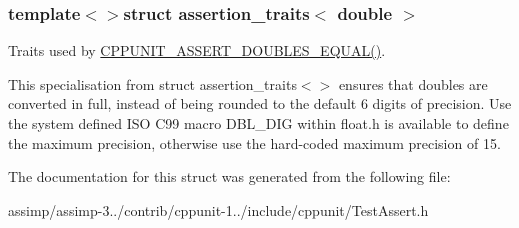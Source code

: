 \subsubsection*{template$<$$>$struct assertion\+\_\+traits$<$ double $>$}

Traits used by \hyperlink{group___assertions_ga9d88b1e379e4a9ba2a5e9e79763389ea}{C\+P\+P\+U\+N\+I\+T\+\_\+\+A\+S\+S\+E\+R\+T\+\_\+\+D\+O\+U\+B\+L\+E\+S\+\_\+\+E\+Q\+U\+A\+L()}. 

This specialisation from {\ttfamily struct} {\ttfamily assertion\+\_\+traits$<$$>$} ensures that doubles are converted in full, instead of being rounded to the default 6 digits of precision. Use the system defined I\+S\+O C99 macro D\+B\+L\+\_\+\+D\+I\+G within float.\+h is available to define the maximum precision, otherwise use the hard-\/coded maximum precision of 15. 

The documentation for this struct was generated from the following file\+:\begin{DoxyCompactItemize}
\item 
assimp/assimp-\/3../contrib/cppunit-\/1../include/cppunit/Test\+Assert.\+h\end{DoxyCompactItemize}
